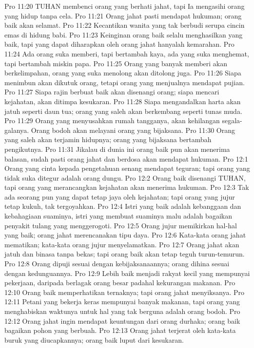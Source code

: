 Pro 11:20  TUHAN membenci orang yang berhati jahat, tapi Ia mengasihi orang yang hidup tanpa cela.
Pro 11:21  Orang jahat pasti mendapat hukuman; orang baik akan selamat.
Pro 11:22  Kecantikan wanita yang tak berbudi serupa cincin emas di hidung babi.
Pro 11:23  Keinginan orang baik selalu menghasilkan yang baik, tapi yang dapat diharapkan oleh orang jahat hanyalah kemarahan.
Pro 11:24  Ada orang suka memberi, tapi bertambah kaya, ada yang suka menghemat, tapi bertambah miskin papa.
Pro 11:25  Orang yang banyak memberi akan berkelimpahan, orang yang suka menolong akan ditolong juga.
Pro 11:26  Siapa menimbun akan dikutuk orang, tetapi orang yang menjualnya mendapat pujian.
Pro 11:27  Siapa rajin berbuat baik akan disenangi orang; siapa mencari kejahatan, akan ditimpa kesukaran.
Pro 11:28  Siapa mengandalkan harta akan jatuh seperti daun tua; orang yang saleh akan berkembang seperti tunas muda.
Pro 11:29  Orang yang menyusahkan rumah tangganya, akan kehilangan segala-galanya. Orang bodoh akan melayani orang yang bijaksana.
Pro 11:30  Orang yang saleh akan terjamin hidupnya; orang yang bijaksana bertambah pengikutnya.
Pro 11:31  Jikalau di dunia ini orang baik pun akan menerima balasan, sudah pasti orang jahat dan berdosa akan mendapat hukuman.
Pro 12:1  Orang yang cinta kepada pengetahuan senang mendapat teguran; tapi orang yang tidak suka ditegur adalah orang dungu.
Pro 12:2  Orang baik disenangi TUHAN, tapi orang yang merancangkan kejahatan akan menerima hukuman.
Pro 12:3  Tak ada seorang pun yang dapat tetap jaya oleh kejahatan; tapi orang yang jujur tetap kukuh, tak tergoyahkan.
Pro 12:4  Istri yang baik adalah kebanggaan dan kebahagiaan suaminya, istri yang membuat suaminya malu adalah bagaikan penyakit tulang yang menggerogoti.
Pro 12:5  Orang jujur memikirkan hal-hal yang baik; orang jahat merencanakan tipu daya.
Pro 12:6  Kata-kata orang jahat mematikan; kata-kata orang jujur menyelamatkan.
Pro 12:7  Orang jahat akan jatuh dan binasa tanpa bekas; tapi orang baik akan tetap teguh turun-temurun.
Pro 12:8  Orang dipuji sesuai dengan kebijaksanaannya; orang dihina sesuai dengan kedunguannya.
Pro 12:9  Lebih baik menjadi rakyat kecil yang mempunyai pekerjaan, daripada berlagak orang besar padahal kekurangan makanan.
Pro 12:10  Orang baik memperhatikan ternaknya; tapi orang jahat menyiksanya.
Pro 12:11  Petani yang bekerja keras mempunyai banyak makanan, tapi orang yang menghabiskan waktunya untuk hal yang tak berguna adalah orang bodoh.
Pro 12:12  Orang jahat ingin mendapat keuntungan dari orang durhaka; orang baik bagaikan pohon yang berbuah.
Pro 12:13  Orang jahat terjerat oleh kata-kata buruk yang diucapkannya; orang baik luput dari kesukaran.
